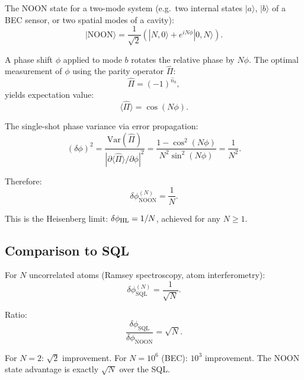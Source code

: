 \documentclass[11pt]{article}
\theoremstyle{definition}
\theoremstyle{remark}
\begin{document}
The NOON state for a two-mode system (e.g.\ two internal states $|a\rangle$,
$|b\rangle$ of a BEC sensor, or two spatial modes of a cavity):
\begin{equation}
|\mathrm{NOON}\rangle = \frac{1}{\sqrt{2}}\left(|N,0\rangle + e^{iN\phi}|0,N\rangle\right).
\label{eq:noon-state}
\end{equation}

A phase shift $\phi$ applied to mode $b$ rotates the relative phase by $N\phi$.
The optimal measurement of $\phi$ using the parity operator $\hat{\Pi}$:
\begin{equation}
\hat{\Pi} = (-1)^{\hat{n}_b},
\end{equation}
yields expectation value:
\begin{equation}
\langle\hat{\Pi}\rangle = \cos(N\phi).
\end{equation}

The single-shot phase variance via error propagation:
\begin{equation}
(\delta\phi)^2 = \frac{\mathrm{Var}(\hat{\Pi})}{|\partial\langle\hat{\Pi}\rangle/\partial\phi|^2}
= \frac{1 - \cos^2(N\phi)}{N^2 \sin^2(N\phi)}
= \frac{1}{N^2}.
\end{equation}

Therefore:
\begin{equation}
\boxed{\delta\phi_{\mathrm{NOON}}^{(N)} = \frac{1}{N}.}
\label{eq:noon-sensitivity}
\end{equation}

This is the Heisenberg limit: $\delta\phi_{\rm HL} = 1/N$, achieved for
any $N \geq 1$.

\subsection{Comparison to SQL}

For $N$ uncorrelated atoms (Ramsey spectroscopy, atom interferometry):
\begin{equation}
\delta\phi_{\mathrm{SQL}}^{(N)} = \frac{1}{\sqrt{N}}.
\end{equation}

Ratio:
\begin{equation}
\frac{\delta\phi_{\mathrm{SQL}}}{\delta\phi_{\mathrm{NOON}}} = \sqrt{N}.
\label{eq:noon-sql-ratio}
\end{equation}

For $N = 2$: $\sqrt{2}$ improvement. For $N = 10^6$ (BEC): $10^3$ improvement.
The NOON state advantage is exactly $\sqrt{N}$ over the SQL.
\end{document}
